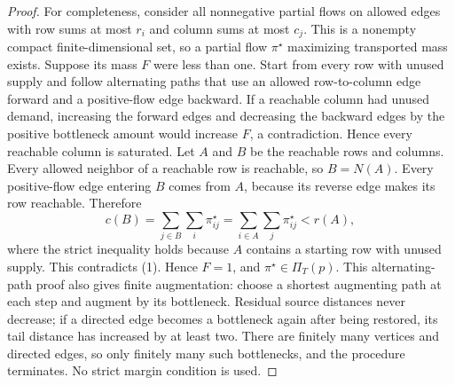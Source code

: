 \documentclass{article}
\begin{document}
\begin{proof}
For completeness, consider all nonnegative partial flows on allowed edges with row sums at most \(r_i\) and column sums at most \(c_j\).  This is a nonempty compact finite-dimensional set, so a partial flow \(\pi^\star\) maximizing transported mass exists.  Suppose its mass \(F\) were less than one.  Start from every row with unused supply and follow alternating paths that use an allowed row-to-column edge forward and a positive-flow edge backward.  If a reachable column had unused demand, increasing the forward edges and decreasing the backward edges by the positive bottleneck amount would increase \(F\), a contradiction.  Hence every reachable column is saturated.  Let \(A\) and \(B\) be the reachable rows and columns.  Every allowed neighbor of a reachable row is reachable, so \(B=N(A)\).  Every positive-flow edge entering \(B\) comes from \(A\), because its reverse edge makes its row reachable.  Therefore
\[
 c(B)=\sum_{j\in B}\sum_i\pi^\star_{ij}
       =\sum_{i\in A}\sum_j\pi^\star_{ij}<r(A),
\]
where the strict inequality holds because \(A\) contains a starting row with unused supply.  This contradicts (1).  Hence \(F=1\), and \(\pi^\star\in\Pi_T(p)\).  This alternating-path proof also gives finite augmentation: choose a shortest augmenting path at each step and augment by its bottleneck.  Residual source distances never decrease; if a directed edge becomes a bottleneck again after being restored, its tail distance has increased by at least two.  There are finitely many vertices and directed edges, so only finitely many such bottlenecks, and the procedure terminates.  No strict margin condition is used.


\end{proof}
\end{document}
